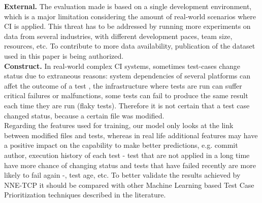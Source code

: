 \textbf{External.} The evaluation made is based on a single development environment, which is a major limitation considering the amount of real-world scenarios where CI is applied. This threat has to be addressed by running more experiments on data from several industries, with different development paces, team size, resources, etc. To contribute to more data availability, publication of the dataset used in this paper is being authorized. \\

\textbf{Construct.} In real-world complex CI systems, sometimes test-cases change status due to extraneous reasons: system dependencies of several platforms can affet the outcome of a test , the infrastructure where tests are run can suffer critical failures or malfunctions, some tests can fail to produce the same result each time they are run (flaky tests). Therefore it is not certain that a test case changed status, because a certain file was modified. \\
Regarding the features used for training, our model only looks at the link between modified files and tests, whereas in real life additional features may have a positive impact on the capability to make better predictions, e.g. commit author, execution history of each test - test that are not applied in a long time have more chance of changing status and tests that have failed recently are more likely to fail again -, test age, etc. 
To better validate the results achieved by NNE-TCP it should be compared with other Machine Learning based Test Case Prioritization techniques described in the literature.


